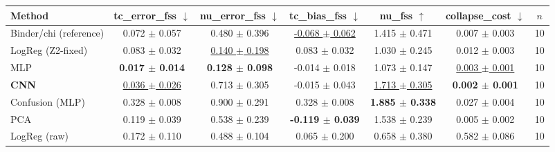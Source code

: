 \begin{tabular}{lcccccc}
\toprule
Method & tc\_error\_fss $\downarrow$ & nu\_error\_fss $\downarrow$ & tc\_bias\_fss $\downarrow$ & nu\_fss $\uparrow$ & collapse\_cost $\downarrow$ & $n$ \\
\midrule
Binder/chi (reference) & 0.072 $\pm$ 0.057 & 0.480 $\pm$ 0.396 & \underline{-0.068 $\pm$ 0.062} & 1.415 $\pm$ 0.471 & 0.007 $\pm$ 0.003 & 10 \\
LogReg (Z2-fixed) & 0.083 $\pm$ 0.032 & \underline{0.140 $\pm$ 0.198} & 0.083 $\pm$ 0.032 & 1.030 $\pm$ 0.245 & 0.012 $\pm$ 0.003 & 10 \\
MLP & \textbf{0.017 $\pm$ 0.014} & \textbf{0.128 $\pm$ 0.098} & -0.014 $\pm$ 0.018 & 1.073 $\pm$ 0.147 & \underline{0.003 $\pm$ 0.001} & 10 \\
\textbf{CNN} & \underline{0.036 $\pm$ 0.026} & 0.713 $\pm$ 0.305 & -0.015 $\pm$ 0.043 & \underline{1.713 $\pm$ 0.305} & \textbf{0.002 $\pm$ 0.001} & 10 \\
Confusion (MLP) & 0.328 $\pm$ 0.008 & 0.900 $\pm$ 0.291 & 0.328 $\pm$ 0.008 & \textbf{1.885 $\pm$ 0.338} & 0.027 $\pm$ 0.004 & 10 \\
PCA & 0.119 $\pm$ 0.039 & 0.538 $\pm$ 0.239 & \textbf{-0.119 $\pm$ 0.039} & 1.538 $\pm$ 0.239 & 0.005 $\pm$ 0.002 & 10 \\
LogReg (raw) & 0.172 $\pm$ 0.110 & 0.488 $\pm$ 0.104 & 0.065 $\pm$ 0.200 & 0.658 $\pm$ 0.380 & 0.582 $\pm$ 0.086 & 10 \\
\bottomrule
\end{tabular}
